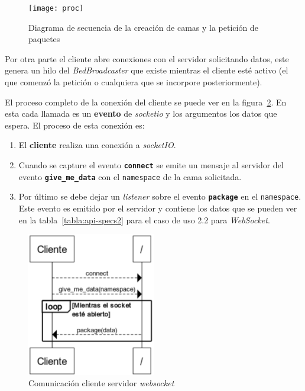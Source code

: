 \begin{figure}
	\centering
	\texttt{[image: proc]}
	\caption{Diagrama de secuencia de la creación de camas y la petición de paquetes}
	\label{fig:proc_sec}
\end{figure}

Por otra parte el cliente abre conexiones con el servidor solicitando datos, este genera un hilo del \textit{BedBroadcaster} que existe mientras el cliente esté activo (el que comenzó la petición o cualquiera que se incorpore posteriormente). 

El proceso completo de la conexión del cliente se puede ver en la figura~\ref{fig:ws-secuence}. En esta cada llamada es un \textbf{evento} de \textit{socketio} y los argumentos los datos que espera. El proceso de esta conexión es:
\begin{enumerate}
	\item El \textbf{cliente} realiza una conexión a \textit{socketIO}.
	\item Cuando se capture el evento \texttt{\textbf{connect}} se emite un mensaje al servidor del evento \texttt{\textbf{give\_me\_data}} con el \texttt{namespace} de la cama solicitada.
	\item Por último se debe dejar un \textit{listener} sobre el evento \texttt{\textbf{package}} en el \texttt{namespace}. Este evento es emitido por el servidor y contiene los datos que se pueden ver en la tabla~\ref{tabla:api-specs2} para el caso de uso 2.2 para \textit{WebSocket}.
\end{enumerate}

\begin{figure}
	\centering
	\includegraphics[width=0.5\textwidth]{img/ws-secuence.png}
	\caption{Comunicación cliente servidor \textit{websocket}}
	\label{fig:ws-secuence}
\end{figure}

